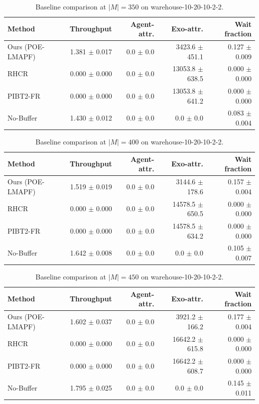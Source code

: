 \begin{table}[t]
\centering
\small
\begin{tabular}{lrrrr}
\toprule
Method & Throughput & Agent-attr. & Exo-attr. & Wait fraction \\
\midrule
Ours (POE-LMAPF) & 1.381 $\pm$ 0.017 & 0.0 $\pm$ 0.0 & 3423.6 $\pm$ 451.1 & 0.127 $\pm$ 0.009 \\
RHCR & 0.000 $\pm$ 0.000 & 0.0 $\pm$ 0.0 & 13053.8 $\pm$ 638.5 & 0.000 $\pm$ 0.000 \\
PIBT2-FR & 0.000 $\pm$ 0.000 & 0.0 $\pm$ 0.0 & 13053.8 $\pm$ 641.2 & 0.000 $\pm$ 0.000 \\
No-Buffer & 1.430 $\pm$ 0.012 & 0.0 $\pm$ 0.0 & 0.0 $\pm$ 0.0 & 0.083 $\pm$ 0.004 \\
\bottomrule
\end{tabular}
\caption{Baseline comparison at $|M|=350$ on warehouse-10-20-10-2-2.}
\label{tab:baselines_350}
\end{table}

\begin{table}[t]
\centering
\small
\begin{tabular}{lrrrr}
\toprule
Method & Throughput & Agent-attr. & Exo-attr. & Wait fraction \\
\midrule
Ours (POE-LMAPF) & 1.519 $\pm$ 0.019 & 0.0 $\pm$ 0.0 & 3144.6 $\pm$ 178.6 & 0.157 $\pm$ 0.004 \\
RHCR & 0.000 $\pm$ 0.000 & 0.0 $\pm$ 0.0 & 14578.5 $\pm$ 650.5 & 0.000 $\pm$ 0.000 \\
PIBT2-FR & 0.000 $\pm$ 0.000 & 0.0 $\pm$ 0.0 & 14578.5 $\pm$ 634.2 & 0.000 $\pm$ 0.000 \\
No-Buffer & 1.642 $\pm$ 0.008 & 0.0 $\pm$ 0.0 & 0.0 $\pm$ 0.0 & 0.105 $\pm$ 0.007 \\
\bottomrule
\end{tabular}
\caption{Baseline comparison at $|M|=400$ on warehouse-10-20-10-2-2.}
\label{tab:baselines_400}
\end{table}

\begin{table}[t]
\centering
\small
\begin{tabular}{lrrrr}
\toprule
Method & Throughput & Agent-attr. & Exo-attr. & Wait fraction \\
\midrule
Ours (POE-LMAPF) & 1.602 $\pm$ 0.037 & 0.0 $\pm$ 0.0 & 3921.2 $\pm$ 166.2 & 0.177 $\pm$ 0.004 \\
RHCR & 0.000 $\pm$ 0.000 & 0.0 $\pm$ 0.0 & 16642.2 $\pm$ 615.8 & 0.000 $\pm$ 0.000 \\
PIBT2-FR & 0.000 $\pm$ 0.000 & 0.0 $\pm$ 0.0 & 16642.2 $\pm$ 608.7 & 0.000 $\pm$ 0.000 \\
No-Buffer & 1.795 $\pm$ 0.025 & 0.0 $\pm$ 0.0 & 0.0 $\pm$ 0.0 & 0.145 $\pm$ 0.011 \\
\bottomrule
\end{tabular}
\caption{Baseline comparison at $|M|=450$ on warehouse-10-20-10-2-2.}
\label{tab:baselines_450}
\end{table}
